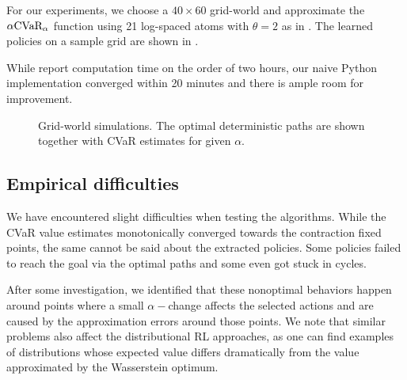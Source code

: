 For our experiments, we choose a $40 \times 60$ grid-world and approximate the $\alpha\text{CVaR}_\alpha$ function using 21 log-spaced atoms with $\theta=2$ as in \citep{chow2015risk}. The learned policies on a sample grid are shown in .

While \citet{chow2015risk} report computation time on the order of two hours, our naive Python implementation converged within 20 minutes and there is ample room for improvement.

\begin{figure}[h]
\center
{}
\caption[CVaR Value Iteration Grid-world simulations.]{Grid-world simulations. The optimal deterministic paths are shown together with CVaR estimates for given $\alpha$.}
\label{fig:vigrid}
\end{figure}

\subsection{Empirical difficulties}
We have encountered slight difficulties when testing the algorithms. While the CVaR value estimates monotonically converged towards the contraction fixed points, the same cannot be said about the extracted policies. Some policies failed to reach the goal via the optimal paths and some even got stuck in cycles.

After some investigation, we identified that these nonoptimal behaviors happen around points where a small $\alpha-$change affects the selected actions and are caused by the approximation errors around those points. We note that similar problems also affect the distributional RL approaches, as one can find examples of distributions whose expected value differs dramatically from the value approximated by the Wasserstein optimum.

